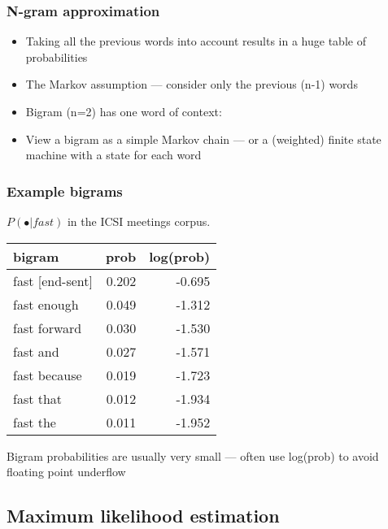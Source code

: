 \begin{frame}
  \frametitle{N-gram approximation}
  \begin{itemize}
  \item<1-> Taking \alert{all} the previous words into account results in
    a \alert{huge} table of probabilities
  \item<2-> The \alert{Markov} assumption --- consider only the previous
    (n-1) words
  \item<3-> Bigram (n=2) has one word of context:
  \item<4-> View a bigram as a simple Markov chain --- or a (weighted)
    finite state machine with a state for each word
  \end{itemize}
\end{frame}

\begin{frame}
  \frametitle{Example bigrams}
  $P(\bullet | fast)$ in the ICSI meetings corpus.

  \medskip
  \begin{center}
  \begin{tabular}{|l|rr|}
    \hline
    bigram & prob & log(prob) \\
    \hline
    fast [end-sent] & 0.202 & -0.695 \\
    fast enough & 0.049 & -1.312 \\
    fast forward & 0.030 & -1.530 \\
    fast and    & 0.027 & -1.571 \\
    fast because & 0.019 & -1.723 \\
    fast that & 0.012 & -1.934 \\
    fast the & 0.011 & -1.952 \\
    \hline
  \end{tabular}
  \end{center}

  \pause
  Bigram probabilities are usually very small --- often use log(prob)
  to avoid floating point underflow 
\end{frame}

\subsection{Maximum likelihood estimation}

